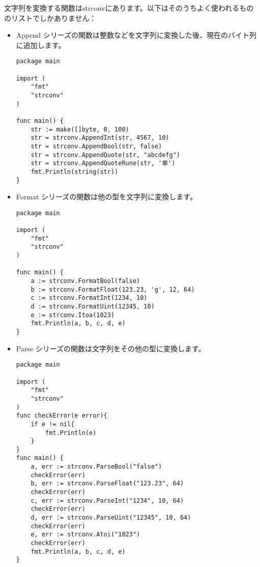 文字列を変換する関数はstrconvにあります。以下はそのうちよく使われるもののリストでしかありません：

\begin{itemize}
  \item Append シリーズの関数は整数などを文字列に変換した後、現在のバイト列に追加します。
\begin{lstlisting}[numbers=none]
package main

import (
    "fmt"
    "strconv"
)

func main() {
    str := make([]byte, 0, 100)
    str = strconv.AppendInt(str, 4567, 10)
    str = strconv.AppendBool(str, false)
    str = strconv.AppendQuote(str, "abcdefg")
    str = strconv.AppendQuoteRune(str, '単')
    fmt.Println(string(str))
}
\end{lstlisting}
  \item Format シリーズの関数は他の型を文字列に変換します。
\begin{lstlisting}[numbers=none]
package main

import (
    "fmt"
    "strconv"
)

func main() {
    a := strconv.FormatBool(false)
    b := strconv.FormatFloat(123.23, 'g', 12, 64)
    c := strconv.FormatInt(1234, 10)
    d := strconv.FormatUint(12345, 10)
    e := strconv.Itoa(1023)
    fmt.Println(a, b, c, d, e)
}
\end{lstlisting}
  \item Parse シリーズの関数は文字列をその他の型に変換します。
\begin{lstlisting}[numbers=none]
package main

import (
    "fmt"
    "strconv"
)
func checkError(e error){
    if e != nil{
        fmt.Println(e)
    }
}
func main() {
    a, err := strconv.ParseBool("false")
    checkError(err)
    b, err := strconv.ParseFloat("123.23", 64)
    checkError(err)
    c, err := strconv.ParseInt("1234", 10, 64)
    checkError(err)
    d, err := strconv.ParseUint("12345", 10, 64)
    checkError(err)
    e, err := strconv.Atoi("1023")
    checkError(err)
    fmt.Println(a, b, c, d, e)
}
\end{lstlisting}
\end{itemize}
